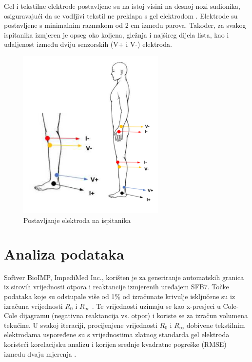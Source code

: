 \documentclass[../diplomski_rad.tex]{subfiles}
\begin{document}
Gel i tekstilne elektrode postavljene su na istoj visini na desnoj nozi sudionika, osiguravajući da se 
vodljivi tekstil ne preklapa s gel elektrodom \cite{Piper2023}. 
Elektrode su postavljene s minimalnim razmakom od 2 cm između parova. 
Također, za svakog ispitanika izmjeren je opseg oko koljena, gležnja i najšireg dijela lista, 
kao i udaljenost između dviju senzorskih (V+ i V-) elektroda.

\begin{figure}[htb]
    \centering
    \includegraphics[width=0.65\textwidth]{Figures/postavljanje_elektroda.png} 
    \caption{Postavljanje elektroda na ispitanika \cite{Piper2023}}
    \label{slk:postavljanje_elektroda}
\end{figure}

\section{Analiza podataka}

Softver BioIMP, ImpediMed Inc., korišten je za generiranje automatskih granica iz sirovih 
vrijednosti otpora i reaktancije izmjerenih uređajem SFB7. 
Točke podataka koje su odstupale više od 1\% od izračunate krivulje isključene 
su iz izračuna vrijednosti $R_{0}$ i $R_{\infty}$ \cite{Piper2023}. 
Te vrijednosti uzimaju se kao x-presjeci u Cole-Cole dijagramu (negativna reaktancija vs. otpor) 
i koriste se za izračun volumena tekućine. 
U svakoj iteraciji, procijenjene vrijednosti $R_{0}$ i $R_{\infty}$ dobivene tekstilnim elektrodama uspoređene
su s vrijednostima zlatnog standarda gel elektroda koristeći korelacijsku analizu i korijen 
srednje kvadratne pogreške (RMSE) između dvaju mjerenja \cite{Piper2023}.
\end{document}
